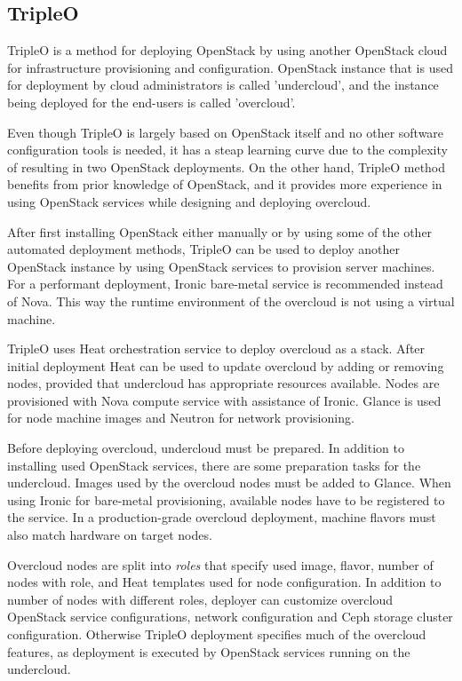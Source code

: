 \subsection{TripleO}

TripleO \cite{tripleo} is a method for deploying OpenStack by using another
OpenStack cloud for infrastructure provisioning and configuration. OpenStack
instance that is used for deployment by cloud administrators is called
'undercloud', and the instance being deployed for the end-users is called
'overcloud'.

Even though TripleO is largely based on OpenStack itself and no other software
configuration tools is needed, it has a steap learning curve due to the
complexity of resulting in two OpenStack deployments. On the other hand,
TripleO method benefits from prior knowledge of OpenStack, and it provides more
experience in using OpenStack services while designing and deploying overcloud.

After first installing OpenStack either manually or by using some of the other
automated deployment methods, TripleO can be used to deploy another OpenStack
instance by using OpenStack services to provision server machines. For a
performant deployment, Ironic bare-metal service is recommended instead of
Nova. This way the runtime environment of the overcloud is not using a virtual
machine.

TripleO uses Heat orchestration service to deploy overcloud as a stack. After
initial deployment Heat can be used to update overcloud by adding or removing
nodes, provided that undercloud has appropriate resources available. Nodes are
provisioned with Nova compute service with assistance of Ironic. Glance is used
for node machine images and Neutron for network provisioning.

Before deploying overcloud, undercloud must be prepared. In addition to
installing used OpenStack services, there are some preparation tasks for the
undercloud. Images used by the overcloud nodes must be added to Glance. When
using Ironic for bare-metal provisioning, available nodes have to be registered
to the service. In a production-grade overcloud deployment, machine flavors
must also match hardware on target nodes.

Overcloud nodes are split into \textit{roles} that specify used image, flavor,
number of nodes with role, and Heat templates used for node configuration. In
addition to number of nodes with different roles, deployer can customize
overcloud OpenStack service configurations, network configuration and Ceph
storage cluster configuration. Otherwise TripleO deployment specifies much of
the overcloud features, as deployment is executed by OpenStack services running
on the undercloud.

